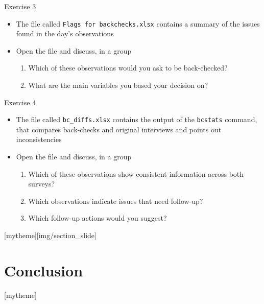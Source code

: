 \documentclass[aspectratio=169]{beamer}
\newcommand{\sectionpic}[2]{
	\setbeamertemplate{section page}[mytheme][#2]
	\section{#1}
	\setbeamertemplate{section page}[mytheme]
}
\begin{document}
\begin{frame}{Exercise 3}
\begin{itemize}
	\item The file called \texttt{Flags for backchecks.xlsx} contains a summary of the issues found in the day's observations
	\item Open the file and discuss, in a group
	\begin{enumerate}
		\item Which of these observations would you ask to be back-checked?
		\item What are the main variables you based your decision on?
	\end{enumerate}
\end{itemize}
\end{frame}

\begin{frame}{Exercise 4}
\begin{itemize}
	\item The file called \texttt{bc\_diffs.xlsx} contains the output of the \texttt{bcstats} command, that compares back-checks and original interviews and points out inconsistencies
	\item Open the file and discuss, in a group
	\begin{enumerate}
		\item Which of these observations show consistent information across both surveys?
		\item Which observations indicate issues that need follow-up?
		\item Which follow-up actions would you suggest?
	\end{enumerate}
\end{itemize}
\end{frame}


\sectionpic{Conclusion}{img/section_slide}
\end{document}
